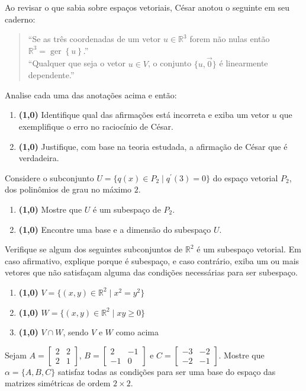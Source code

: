 \documentclass[12pt,a4paper]{article}
\newcommand{\fixme}{{\color{red}(...)}}
\newcommand*\ger[1]{\operatorname{ger}\left\{#1\right\}}
\newcommand*\R{\mathbb{R}}
\begin{document}
\begin{ExerciseList}

\Exercise%
Ao revisar o que sabia sobre espaços vetoriais, César anotou o seguinte em seu caderno:
\begin{quote}
\centering
``Se as três coordenadas de um vetor $u \in \R^3$ forem não nulas então $\R^3 = \ger{u}$.''\\
``Qualquer que seja o vetor $u \in V$, o conjunto $\{ u, \vec{0} \}$ é linearmente dependente.''
\end{quote}
Analise cada uma das anotações acima e então:
\begin{enumerate}
\item \textbf{(1,0)} Identifique qual das afirmações está incorreta e exiba um vetor $u$ que exemplifique o erro no raciocínio de César.
\item \textbf{(1,0)} Justifique, com base na teoria estudada, a afirmação de César que é verdadeira.
\end{enumerate}
\Answer \fixme

\Exercise%
Considere o subconjunto $U = \{ q(x) \in P_2 \mid q^\prime(3) = 0 \}$ do espaço vetorial $P_2$, dos polinômios de grau no máximo $2$.
\begin{enumerate}
\item \textbf{(1,0)} Mostre que $U$ é um subespaço de $P_2$.
\item \textbf{(1,0)} Encontre uma base e a dimensão do subespaço $U$.
\end{enumerate}
\Answer \fixme

\Exercise%
Verifique se algum dos seguintes subconjuntos de $\R^2$ é um subespaço vetorial. Em caso afirmativo, explique porque é subespaço, e caso contrário, exiba um ou mais vetores que não satisfaçam alguma das condições necessárias para ser subespaço.
\begin{enumerate}
\item \textbf{(1,0)} $V = \{ (x,y) \in \R^2 \mid x^2 = y^2 \}$
\item \textbf{(1,0)} $W = \{ (x,y) \in \R^2 \mid xy\geq 0 \}$
\item \textbf{(1,0)} $V \cap W$, sendo $V$ e $W$ como acima
\end{enumerate}
\Answer \fixme

\Exercise[title={2,0}] Sejam $A = \begin{bmatrix}
2 & 2 \\
2 & 1
\end{bmatrix}$, $B = \begin{bmatrix}
2 & -1 \\
-1 & 0
\end{bmatrix}$ e $C = \begin{bmatrix}
-3 & -2 \\
-2 & -1
\end{bmatrix}$. Mostre que $\alpha = \{ A, B, C \}$ satisfaz todas as condições para ser uma base do espaço das matrizes simétricas de ordem $2 \times 2$.
\Answer \fixme


\end{ExerciseList}
\end{document}
